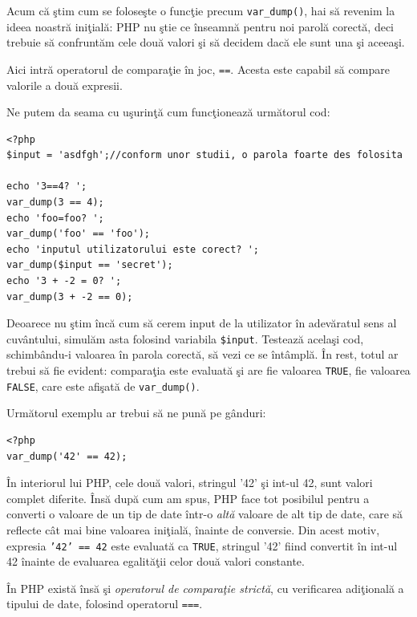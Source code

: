 Acum că ştim cum se foloseşte o funcţie precum \texttt{var\_dump()},
hai să revenim la ideea noastră iniţială: PHP nu ştie ce
înseamnă pentru noi {\glqq}parolă corectă{\grqq}, deci trebuie să confruntăm
cele două valori şi să decidem dacă ele sunt una şi aceeaşi.

Aici intră operatorul de comparaţie în joc, \texttt{==}. Acesta
este capabil să compare valorile a două expresii.


Ne putem da seama cu uşurinţă cum funcţionează următorul cod:
\begin{lstlisting}
<?php
$input = 'asdfgh';//conform unor studii, o parola foarte des folosita

echo '3==4? ';
var_dump(3 == 4);
echo 'foo=foo? ';
var_dump('foo' == 'foo');
echo 'inputul utilizatorului este corect? ';
var_dump($input == 'secret');
echo '3 + -2 = 0? ';
var_dump(3 + -2 == 0);
\end{lstlisting}

Deoarece nu ştim încă cum să cerem input de la utilizator
în adevăratul sens al cuvântului, simulăm asta folosind variabila \texttt{\$input}.
Testează acelaşi cod, schimbându-i valoarea în parola corectă,
să vezi ce se întâmplă. În rest, totul ar trebui să fie evident: comparaţia
este evaluată şi are fie valoarea \texttt{TRUE}, fie valoarea \texttt{FALSE},
care este afişată de \texttt{var\_dump()}.

Următorul exemplu ar trebui să ne pună pe gânduri:
\begin{lstlisting}
<?php
var_dump('42' == 42);
\end{lstlisting}
În interiorul lui PHP, cele două valori, stringul '42'
şi int-ul 42, sunt valori complet diferite. Însă
după cum am spus, PHP face tot posibilul pentru a
converti o valoare de un tip de date într-o \textit{altă}
valoare de alt tip de date, care să reflecte cât mai bine
valoarea iniţială, înainte de conversie.
Din acest motiv, expresia \texttt{'42' == 42} este evaluată
ca \texttt{TRUE}, stringul '42' fiind convertit în int-ul 42 înainte
de evaluarea egalităţii celor două valori constante.

În PHP există însă şi \textsl{operatorul de comparaţie strictă}, cu
verificarea adiţională a tipului de date, folosind operatorul
\texttt{===}.

